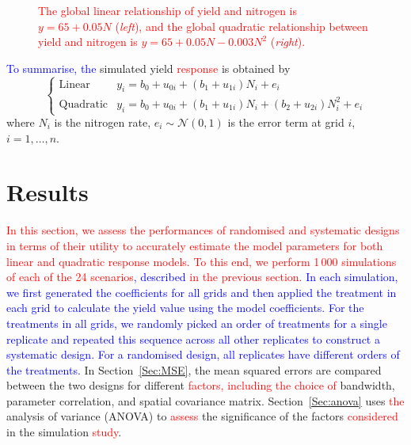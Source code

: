 \documentclass[a4paper]{article} 	%
\newcommand{\N}{\mathcal{N}}
\newcommand{\revision}[1]{\textcolor{red}{#1}}
\newcommand{\zc}[1]{\textcolor{blue}{#1}}
\begin{document}
\begin{figure}[H]
\begin{subfigure}[t]{0.45\textwidth}
        \end{subfigure}
	\caption{\revision{The global linear relationship of yield and nitrogen is $y=65+0.05N$ (\textit{left}), and the global quadratic relationship between yield and nitrogen is $y=65+0.05N-0.003N^2$ (\textit{right}).}}\label{fig:Lines}
\end{figure}


\zc{To summarise, the} simulated yield \revision{response} is obtained by 
\begin{equation}
\begin{cases}
	\text{Linear}  &y_i = b_0 + u_{0i} + (b_1 + u_{1i})N_i + e_i \\
	\text{Quadratic} &y_i = b_0 + u_{0i} + (b_1 + u_{1i})N_i + (b_2 + u_{2i})N_i^2 + e_i
\end{cases}
\end{equation}
where $N_i$ is the nitrogen rate, $e_i\sim \N(0,1)$ is the error term at grid $i$, $i = 1, \ldots, n$. 



\section{Results}\label{Sec:Res}

\revision{In this section, we assess the performances of randomised and systematic designs in terms of their utility to accurately estimate the model parameters for both linear and quadratic response models. To this end, we perform 1\,000 simulations of each \revision{of the 24} scenarios\zc{, described} in the previous section.} \zc{In each simulation, we first generated the coefficients for all grids and then applied the treatment in each grid to calculate the yield value using the model coefficients. For the treatments in all grids, we randomly picked an order of treatments for a single replicate and repeated this sequence across all other replicates to construct a systematic design. For a randomised design, all replicates have different orders of the treatments.} In Section~\ref{Sec:MSE}, the mean squared errors are compared between the two designs for different \revision{factors, including the choice of} bandwidth, parameter correlation, and spatial covariance matrix. Section~\ref{Sec:anova} uses \revision{the} analysis of variance (ANOVA) to  \revision{assess} the significance of the factors \revision{considered} in the simulation \revision{study}. %
\end{document}
